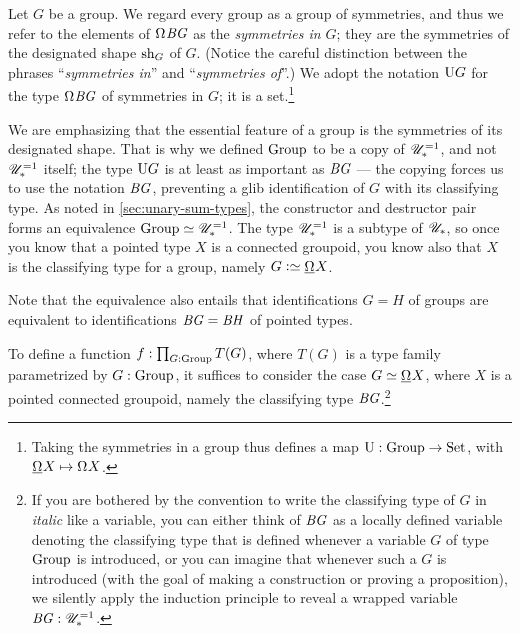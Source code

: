 \begin{definition}\label{def:group-symmetries}
  Let $G$ be a group.
  We regard every group as a group of symmetries,
  and thus we refer to the elements of $\loops \BG$ as the
  \emph{symmetries in $G$};
  they are the symmetries of the designated shape $\mathrm{sh}_G$ of $G$.
  (Notice the careful distinction between the phrases
  ``\emph{symmetries in}'' and ``\emph{symmetries of}''.)
  We adopt the notation $\mathrm{U} G$ for the type $\loops \BG$ of symmetries in $G$;
  it is a set.\footnote{%
    Taking the symmetries in a group
    thus defines a map
    $\mathrm{U} : \mathrm{Group} \to \mathrm{Set}$,
    with $\mkgroup X \mapsto \loops X$.}
\end{definition}

\begin{remark}\label{rem:aut}
  We are emphasizing that the essential feature of a group
  is the symmetries of its designated shape.
  That is why we defined $\mathrm{Group}$ to be a copy of ${\mathscr{U}}_\ast^{=1}$,
  and not ${\mathscr{U}}_\ast^{=1}$ itself;
  the type $\mathrm{U} G$ is at least as important as $\mathit{B}\mathit{G}$
  --- the copying forces us to use the notation $\mathit{B}\mathit{G}$,
  preventing a glib identification of $G$ with its classifying type.
  As noted in \cref{sec:unary-sum-types},
  the constructor and destructor pair forms an equivalence $\mathrm{Group} \simeq {\mathscr{U}}_\ast^{=1}$.
  The type ${\mathscr{U}}_\ast^{=1}$ is a subtype of ${\mathscr{U}_*}$, so
  once you know that a pointed type $X$ is a connected groupoid,
  you know also that $X$ is the classifying type for a group,
  namely $G\defeq\mkgroup X$.

  Note that the equivalence also entails
  that identifications $G=H$ of groups are equivalent
  to identifications $\mathit{B}\mathit{G} = \mathit{B}\mathit{H}$ of pointed types.
\end{remark}

\begin{remark}\label{rem:BG-convention}
  To define a function $f : \prod_{G:\mathrm{Group}}T(G)$,
  where $T(G)$ is a type family parametrized by $G:\mathrm{Group}$,
  it suffices to consider the case $G\jdeq\mkgroup X$,
  where $X$ is a pointed connected groupoid,
  namely the classifying type $\mathit{B}\mathit{G}$.\footnote{%
    If you are bothered by the convention
    to write the classifying type of $G$ in \emph{italic} like a variable,
    you can either think of $\mathit{B}\mathit{G}$ as a locally defined
    variable denoting the classifying type that is
    defined whenever a variable $G$ of type $\mathrm{Group}$ is introduced,
    or you can imagine that whenever such a $G$ is introduced
    (with the goal of making a construction or proving a proposition),
    we silently apply the induction principle to
    reveal a wrapped variable $\mathit{B}\mathit{G}:{\mathscr{U}}_\ast^{=1}$.}
\end{remark}

